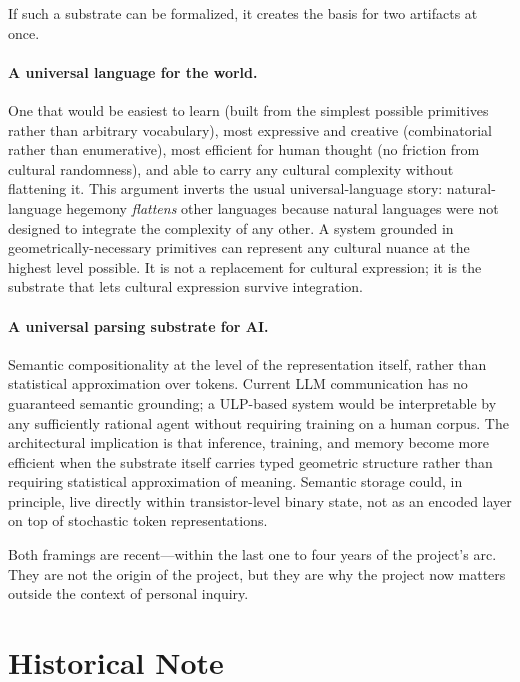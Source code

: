 \documentclass[12pt]{article}
\begin{document}
If such a substrate can be formalized, it creates the basis for two artifacts at once.

\paragraph{A universal language for the world.} One that would be easiest to learn (built from the simplest possible primitives rather than arbitrary vocabulary), most expressive and creative (combinatorial rather than enumerative), most efficient for human thought (no friction from cultural randomness), and able to carry any cultural complexity without flattening it. This argument inverts the usual universal-language story: natural-language hegemony \emph{flattens} other languages because natural languages were not designed to integrate the complexity of any other. A system grounded in geometrically-necessary primitives can represent any cultural nuance at the highest level possible. It is not a replacement for cultural expression; it is the substrate that lets cultural expression survive integration.

\paragraph{A universal parsing substrate for AI.} Semantic compositionality at the level of the representation itself, rather than statistical approximation over tokens. Current LLM communication has no guaranteed semantic grounding; a ULP-based system would be interpretable by any sufficiently rational agent without requiring training on a human corpus. The architectural implication is that inference, training, and memory become more efficient when the substrate itself carries typed geometric structure rather than requiring statistical approximation of meaning. Semantic storage could, in principle, live directly within transistor-level binary state, not as an encoded layer on top of stochastic token representations.

Both framings are recent---within the last one to four years of the project's arc. They are not the origin of the project, but they are why the project now matters outside the context of personal inquiry.

\section{Historical Note}
\label{sec:history}
\end{document}
